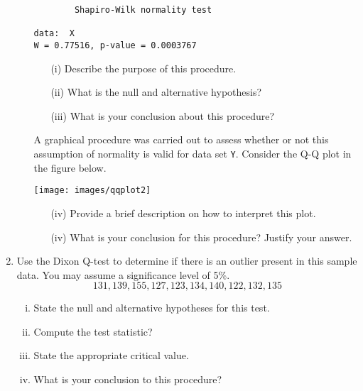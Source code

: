 \documentclass[a4paper,12pt]{article}
\begin{document}
\begin{enumerate}
\begin{enumerate}[(a)]
\begin{center}
\begin{framed}
\begin{verbatim}
        Shapiro-Wilk normality test

data:  X
W = 0.77516, p-value = 0.0003767
\end{verbatim}
\end{framed}
\end{center}


\begin{itemize}
	\item[(i)]  Describe the purpose of this procedure.
	\item[(ii)]  What is the null and alternative hypothesis?
	\item[(iii)]  What is your conclusion about this procedure?
\end{itemize}
\smallskip

 A graphical procedure was carried out to assess whether or not this assumption of normality is valid for data set \texttt{Y}. Consider the Q-Q plot in the figure below.

\begin{center}
	\texttt{[image: images/qqplot2]}
\end{center}

\begin{itemize}
	\item[(iv)]  Provide a brief description on how to interpret this plot.
	\item[(iv)]  What is your conclusion for this procedure? Justify your answer.
\end{itemize}
\end{enumerate}
\newpage


\item Use the Dixon Q-test to determine if there is an outlier present in this sample data. You may assume
a significance level of 5\%.
\[ 131, 139, 155, 127, 123, 
  134, 140, 122, 132, 135\]
\begin{enumerate}[(i)]
\item  State the null and alternative hypotheses for this test.
\item Compute the test statistic?
\item  State the appropriate critical value.
\item  What is your conclusion to this procedure?
\end{enumerate}

\end{enumerate}
\end{document}

